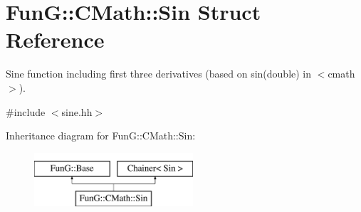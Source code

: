 \hypertarget{structFunG_1_1CMath_1_1Sin}{\section{Fun\-G\-:\-:C\-Math\-:\-:Sin Struct Reference}
\label{structFunG_1_1CMath_1_1Sin}
}


Sine function including first three derivatives (based on sin(double) in $<$cmath$>$).  




{\ttfamily \#include $<$sine.\-hh$>$}

Inheritance diagram for Fun\-G\-:\-:C\-Math\-:\-:Sin\-:\begin{figure}[H]
\begin{center}
\leavevmode
\includegraphics[height=2.000000cm]{structFunG_1_1CMath_1_1Sin}
\end{center}
\end{figure}
